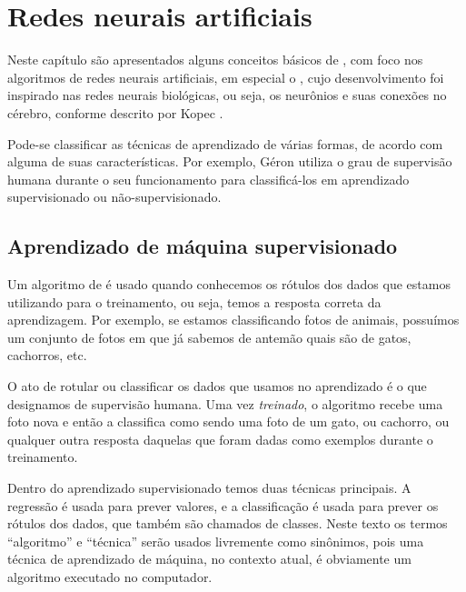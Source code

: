 
\chapter{Redes neurais artificiais}
\label{cap:redes}

Neste capítulo são apresentados alguns conceitos básicos de , com foco nos algoritmos de redes neurais artificiais, em especial o , cujo desenvolvimento foi inspirado nas redes neurais biológicas, ou seja, os neurônios e suas conexões no cérebro, conforme descrito por Kopec \citep{classic}.

Pode-se classificar as técnicas de aprendizado de várias formas, de acordo com alguma de suas características. Por exemplo, Géron \citep{hands} utiliza o grau de supervisão humana durante o seu funcionamento para classificá-los em aprendizado supervisionado ou não-supervisionado.

\section{Aprendizado de máquina supervisionado}

 Um algoritmo de  é usado quando conhecemos os rótulos dos dados que estamos utilizando para o treinamento, ou seja, temos a resposta correta da aprendizagem. Por exemplo, se estamos classificando fotos de animais, possuímos um conjunto de fotos em que já sabemos de antemão quais são de gatos, cachorros, etc.

 O ato de rotular ou classificar os dados que usamos no aprendizado é o que designamos de supervisão humana. Uma vez \emph{treinado}, o algoritmo recebe uma foto nova e então a classifica como sendo uma foto de um gato, ou cachorro, ou qualquer outra resposta daquelas que foram dadas como exemplos durante o treinamento.

Dentro do aprendizado supervisionado temos duas técnicas principais. A regressão é usada para prever valores, e a classificação é usada para prever os rótulos dos dados, que também são chamados de classes. Neste texto os termos ``algoritmo'' e ``técnica'' serão usados livremente como sinônimos, pois uma técnica de aprendizado de máquina, no contexto atual, é obviamente um algoritmo executado no computador.


